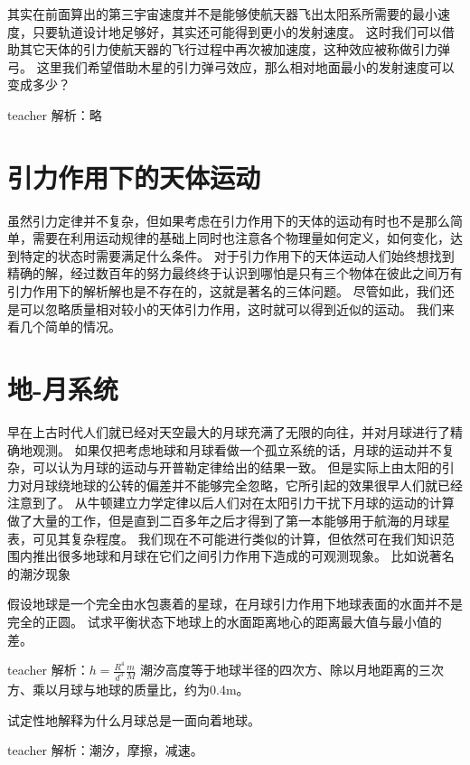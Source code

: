 \begin{example}
其实在前面算出的第三宇宙速度并不是能够使航天器飞出太阳系所需要的最小速度，只要轨道设计地足够好，其实还可能得到更小的发射速度。
这时我们可以借助其它天体的引力使航天器的飞行过程中再次被加速度，这种效应被称做引力弹弓。
这里我们希望借助木星的引力弹弓效应，那么相对地面最小的发射速度可以变成多少？
\begin{taggedblock}{teacher}
\newline
解析：略
\end{taggedblock}
\end{example}

\section{引力作用下的天体运动}
虽然引力定律并不复杂，但如果考虑在引力作用下的天体的运动有时也不是那么简单，需要在利用运动规律的基础上同时也注意各个物理量如何定义，如何变化，达到特定的状态时需要满足什么条件。
对于引力作用下的天体运动人们始终想找到精确的解，经过数百年的努力最终终于认识到哪怕是只有三个物体在彼此之间万有引力作用下的解析解也是不存在的，这就是著名的三体问题。
尽管如此，我们还是可以忽略质量相对较小的天体引力作用，这时就可以得到近似的运动。
我们来看几个简单的情况。





\section{地-月系统}
早在上古时代人们就已经对天空最大的月球充满了无限的向往，并对月球进行了精确地观测。
如果仅把考虑地球和月球看做一个孤立系统的话，月球的运动并不复杂，可以认为月球的运动与开普勒定律给出的结果一致。
但是实际上由太阳的引力对月球绕地球的公转的偏差并不能够完全忽略，它所引起的效果很早人们就已经注意到了。
从牛顿建立力学定律以后人们对在太阳引力干扰下月球的运动的计算做了大量的工作，但是直到二百多年之后才得到了第一本能够用于航海的月球星表，可见其复杂程度。
我们现在不可能进行类似的计算，但依然可在我们知识范围内推出很多地球和月球在它们之间引力作用下造成的可观测现象。
比如说著名的潮汐现象
\begin{example}
假设地球是一个完全由水包裹着的星球，在月球引力作用下地球表面的水面并不是完全的正圆。
试求平衡状态下地球上的水面距离地心的距离最大值与最小值的差。
\begin{taggedblock}{teacher}
\newline
解析：$h=\frac{R^4}{d^3}\frac{m}{M}$ 
潮汐高度等于地球半径的四次方、除以月地距离的三次方、乘以月球与地球的质量比，约为0.4m。
\end{taggedblock}
\end{example}


\begin{example}
试定性地解释为什么月球总是一面向着地球。
\begin{taggedblock}{teacher}
\newline
解析：潮汐，摩擦，减速。
\end{taggedblock}
\end{example}













